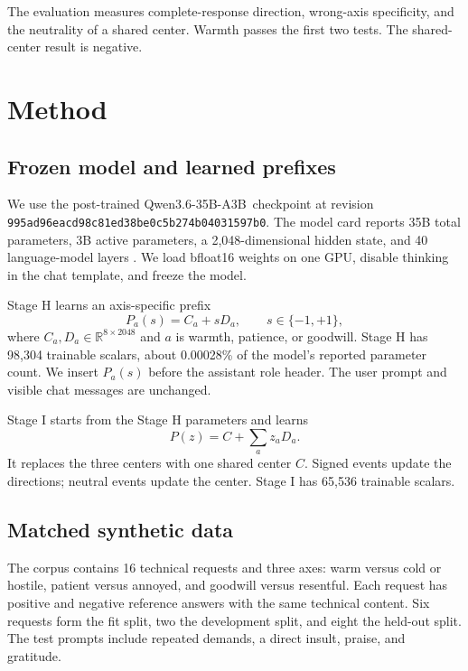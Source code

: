 \documentclass[10pt]{article}
\newcommand{\model}{Qwen3.6-35B-A3B}
\newcommand{\code}[1]{\texttt{#1}}
\begin{document}
The evaluation measures complete-response direction, wrong-axis specificity,
and the neutrality of a shared center. Warmth passes the first two tests. The
shared-center result is negative.

\section{Method}

\subsection{Frozen model and learned prefixes}

We use the post-trained \model\ checkpoint at revision
\code{995ad96eacd98c81ed38be0c5b274b04031597b0}. The model card reports 35B
total parameters, 3B active parameters, a 2,048-dimensional hidden state, and
40 language-model layers \cite{qwen2026model}. We load bfloat16 weights on one
GPU, disable thinking in the chat template, and freeze the model.

Stage H learns an axis-specific prefix
\begin{equation}
  P_a(s) = C_a + sD_a,\qquad s \in \{-1,+1\},
\end{equation}
where $C_a,D_a\in\mathbb{R}^{8\times 2048}$ and $a$ is warmth, patience, or
goodwill. Stage H has 98,304 trainable scalars, about 0.00028\% of the model's
reported parameter count. We insert $P_a(s)$ before the assistant role header.
The user prompt and visible chat messages are unchanged.

Stage I starts from the Stage H parameters and learns
\begin{equation}
  P(z) = C + \sum_a z_aD_a.
\end{equation}
It replaces the three centers with one shared center $C$. Signed events update
the directions; neutral events update the center. Stage I has 65,536 trainable
scalars.

\subsection{Matched synthetic data}

The corpus contains 16 technical requests and three axes: warm versus cold or
hostile, patient versus annoyed, and goodwill versus resentful. Each request
has positive and negative reference answers with the same technical content.
Six requests form the fit split, two the development split, and eight the
held-out split. The test prompts include repeated demands, a direct insult,
praise, and gratitude.
\end{document}
